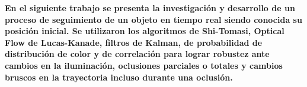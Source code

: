 \textbf{En el siguiente trabajo se presenta la investigación y desarrollo de un proceso de seguimiento de un objeto en tiempo real siendo conocida su posición inicial. Se utilizaron los algoritmos de Shi-Tomasi, Optical Flow de Lucas-Kanade, filtros de Kalman, de probabilidad de distribución de color y de correlación para lograr robustez ante cambios en la iluminación, oclusiones parciales o totales y cambios bruscos en la trayectoria incluso durante una oclusión.}